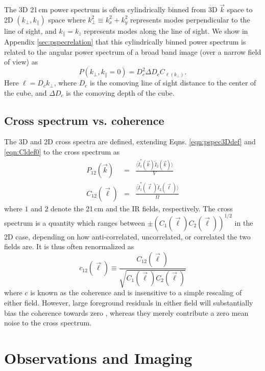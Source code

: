 \documentclass{emulateapj}
\begin{document}
The 3D 21\,cm power spectrum is often cylindrically binned from 3D $\vec{k}$ space to 2D $(k_\perp,k_\parallel)$ space where $k_\perp^2\equiv k_x^2+k_y^2$ represents modes perpendicular to the line of sight, and $k_\parallel=k_z$ represents modes along the line of sight. We show in Appendix \ref{sec:pspecrelation} that this cylindrically binned power spectrum is related to the angular power spectrum of a broad band image (over a narrow field of view) as
\begin{equation}
P(k_\perp,k_\parallel=0)=D_c^2 \Delta D_c C_{\ell(k_\perp)}.
\end{equation}
Here $\ell=D_c k_\perp$, where $D_c$ is the comoving line of sight distance to the center of the cube, and $\Delta D_c$ is the comoving depth of the cube.

\subsection{Cross spectrum vs. coherence}

The 3D and 2D cross spectra are defined, extending Eqns. \ref{eqn:pspec3Ddef} and \ref{eqn:Cldef0} to the cross spectrum as
\begin{eqnarray}
	P_{12}(\vec{k}) &=& \frac{\langle\tilde{I}_1^*(\vec{k})\tilde{I}_2(\vec{k})\rangle}{V}\\
	C_{12}(\vec{\ell}) &=& \frac{\langle \tilde{I}_1^*(\vec{\ell})\tilde{I}_2(\vec{\ell})\rangle}{\Omega}
\end{eqnarray}
where $1$ and $2$ denote the 21\,cm and the IR fields, respectively. The cross spectrum is a quantity which ranges between $\pm(C_{1}(\vec{\ell})C_{2}(\vec{\ell}))^{1/2}$ in the 2D case, depending on how anti-correlated, uncorrelated, or correlated the two fields are. It is thus often renormalized as  
\begin{equation}
\label{eqn:Cldefcross}
	c_{12}(\vec{\ell}) \equiv \frac{C_{12}(\vec{\ell}) }{\sqrt{C_1(\vec{\ell})  C_2(\vec{\ell}) }}
\end{equation}
where $c$ is known as the coherence and is insensitive to a simple rescaling of either field. However, large foreground residuals in either field will substantially bias the coherence towards zero \citep{lidz09,furlanettolidz07}, whereas they merely contribute a zero mean noise to the cross spectrum. 

\section{Observations and Imaging}
\end{document}
